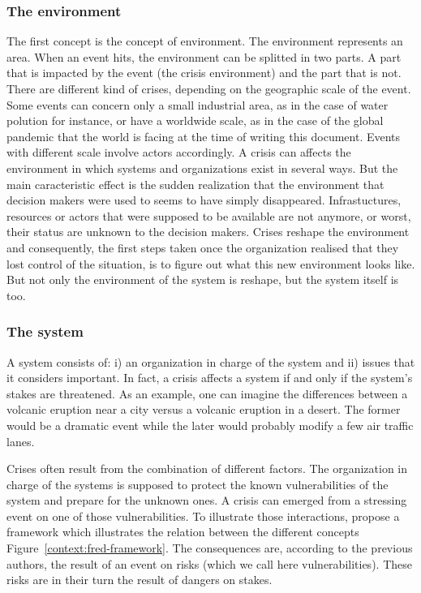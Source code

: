 \subsubsection{The environment}
The first concept is the concept of environment.
The environment represents an area.
When an event hits, the environment can be splitted in two parts.
A part that is impacted by the event (the crisis environment) and the part that is not.
There are different kind of crises, depending on the geographic scale of the event.
Some events can concern only a small industrial area, as in the case of water polution for instance, or have a worldwide scale, as in the case of the global pandemic that the world is facing at the time of writing this document.
Events with different scale involve actors accordingly.
A crisis can affects the environment in which systems and organizations exist in several ways.
But the main caracteristic effect is the sudden realization that the environment that decision makers were used to seems to have simply disappeared.
Infrastuctures, resources or actors that were supposed to be available are not anymore, or worst, their status are unknown to the decision makers.
Crises reshape the environment and consequently, the first steps taken once the organization realised that they lost control of the situation, is to figure out what this new environment looks like.
But not only the environment of the system is reshape, but the system itself is too.

\subsubsection{The system}
A system consists of: i) an organization in charge of the system and ii) issues that it considers important.
In fact, a crisis affects a system if and only if the system's stakes are threatened.
As an example, one can imagine the differences between a volcanic eruption near a city versus a volcanic eruption in a desert.
The former would be a dramatic event while the later would probably modify a few air traffic lanes.

Crises often result from the combination of different factors.
The organization in charge of the systems is supposed to protect the known vulnerabilities of the system and prepare for the unknown ones.
A crisis can emerged from a stressing event on one of those vulnerabilities.
To illustrate those interactions, \cite{benabenCollaborativeSystemsCrisis2014} propose a framework which illustrates the relation between the different concepts Figure~\ref{context:fred-framework}.
The consequences are, according to the previous authors, the result of an event on risks (which we call here vulnerabilities).
These risks are in their turn the result of dangers on stakes.

